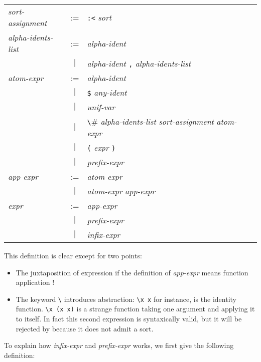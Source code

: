 \begin{center}
\begin{tabular}{lclr}
{\it sort-assignment} &:=& \verb#:<# {\it sort} \\
{\it alpha-idents-list} &:=& {\it alpha-ident} \\
  &$|$& {\it alpha-ident} \verb#,# {\it alpha-idents-list} \\
{\it atom-expr} &:=& {\it alpha-ident} \\
  &$|$& \verb#$# {\it any-ident}  \\
  &$|$& {\it unif-var} \\
  &$|$& \verb#\# {\it alpha-idents-list} {\it sort-assignment} {\it
atom-expr} \\
  &$|$& \verb#(# {\it expr} \verb#)# \\
  &$|$& {\it prefix-expr} \\
{\it app-expr} &:=& {\it atom-expr} \\
  &$|$& {\it atom-expr} {\it app-expr} \\
{\it expr} &:=&  {\it app-expr} \\
&$|$& {\it prefix-expr} \\
&$|$& {\it infix-expr} \\
\end{tabular}
\end{center}

This definition is clear except for two points:
\begin{itemize}
\item The juxtaposition of expression if the definition of {\it
app-expr} means function application ! 
\item The keyword \verb#\# introduces abstraction: 
\verb#\x x# for instance, is the identity function.
\verb#\x (x x)# is a strange function taking one argument and applying
it to itself. In fact this second expression is syntaxically valid, but
it will be rejected by \AFD{}  because it does not admit a sort.
\end{itemize}

To explain how {\it infix-expr} and {\it prefix-expr} works, we first
give the following definition:

